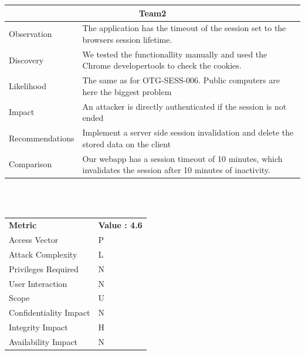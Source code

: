 \documentclass[headsepline,footsepline,footinclude=false,oneside,fontsize=11pt,paper=a4,listof=totoc,bibliography=totoc]{scrbook} %
\begin{document}
\begin{tabular}{ l|p{11cm}  }
	\hline
	\multicolumn{2}{c}{\textbf{Team2}} \\
	\hline
	Observation & The application has the timeout of the session set to the browsers
	session lifetime.\\
	Discovery & We tested the functionallity manually and used the Chrome developertools to check the cookies.\\
	Likelihood & The same as for OTG-SESS-006. Public computers are here the biggest problem\\
	Impact & An attacker is directly authenticated if the session is not ended\\
	Recommendations & Implement a server side session invalidation and delete the stored data on the client\\
	Comparison & Our webapp has a session timeout of 10 minutes, which invalidates the session after 10 minutes of inactivity.\\
	\hline
\end{tabular}
\\
\vspace{0.5cm}
\\
\begin{center}
	\begin{tabular}{ll}
		\rowcolor[HTML]{34CDF9}
		{\color[HTML]{ECF4FF} \textbf{Metric}}        & {\color[HTML]{ECF4FF} \textbf{Value : 4.6}} \\
		\rowcolor[HTML]{BBDAFF}
		{\color[HTML]{333333} Access Vector}          & {\color[HTML]{333333} } P             \\
		\rowcolor[HTML]{ECF4FF}
		{\color[HTML]{333333} Attack Complexity}      & {\color[HTML]{333333} } L              \\
		\rowcolor[HTML]{BBDAFF}
		{\color[HTML]{333333} Privileges Required}    & {\color[HTML]{333333} } N              \\
		\rowcolor[HTML]{ECF4FF}
		{\color[HTML]{333333} User Interaction}       & {\color[HTML]{333333} } N              \\
		\rowcolor[HTML]{BBDAFF}
		{\color[HTML]{333333} Scope}                  & {\color[HTML]{333333} } U              \\
		\rowcolor[HTML]{ECF4FF}
		{\color[HTML]{333333} Confidentiality Impact} & {\color[HTML]{333333} } N              \\
		\rowcolor[HTML]{BBDAFF}
		{\color[HTML]{333333} Integrity Impact}       & {\color[HTML]{333333} } H              \\
		\rowcolor[HTML]{ECF4FF}
		{\color[HTML]{333333} Availability Impact}    & {\color[HTML]{333333} } N
	\end{tabular}
\end{center}
\end{document}
